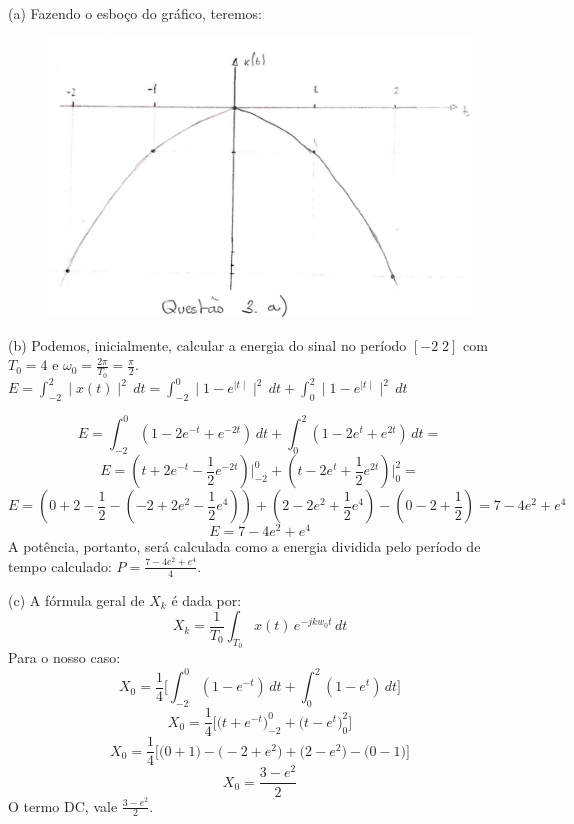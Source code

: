 \documentclass{article}
\begin{document}
\vspace{\baselineskip}

(a) Fazendo o esboço do gráfico, teremos:
\begin{figure}[h!]
    \includegraphics[scale=0.25]{img3a}
    \centering
\end{figure}

\vspace{\baselineskip}

(b) Podemos, inicialmente, calcular a energia do sinal no período $[-2\;2]$ com $T_{0} = 4$ e $\omega_{0} = \frac{2 \pi}{T_{0}} = \frac{\pi}{2}$.\\
$E = \int_{-2}^{2} \mid x(t) \mid ^{2}\,dt = \int_{-2}^{0} \mid 1 - e^{\mid t\mid} \mid^{2}\,dt + \int_{0}^{2} \mid 1 - e^{\mid t\mid} \mid^{2}\,dt$

\[E = \int_{-2}^{0} (1 - 2e^{-t} + e^{-2t})\,dt + \int_{0}^{2} (1 - 2e^{t} + e^{2t})\,dt =\]
\[E = (t + 2e^{-t} - \frac{1}{2}e^{-2t}) \bigg|_{-2}^{0} + (t - 2e^{t} + \frac{1}{2}e^{2t}) \bigg|_{0}^{2} = \]
\[E = (0 +2 - \frac{1}{2} - (-2 + 2e^{2} - \frac{1}{2}e^{4})) + (2 - 2e^{2} + \frac{1}{2}e^{4}) - (0 -2 + \frac{1}{2}) = 7 - 4e^{2} + e^{4}\]
\[E = 7 - 4e^{2} + e^{4}\]
A potência, portanto, será calculada como a energia dividida pelo período de tempo calculado: $P = \frac{7 - 4e^{2} + e^{4}}{4}$.

\vspace{\baselineskip}

(c) A fórmula geral de $X_{k}$ é dada por:
\[X_{k} = \frac{1}{T_{0}} \int_{T_{0}} x(t)\,e^{-jkw_{0}t}\,dt\]
Para o nosso caso:
\[X_{0} = \frac{1}{4} \biggl[\int_{-2}^{0} (1 - e^{-t})\,dt + \int_{0}^{2} (1 - e^{t})\,dt\biggr]\]
\[X_{0} = \frac{1}{4} \biggl[\bigl(t + e^{-t}\bigr)_{-2}^{0} + \bigl(t - e^{t}\bigr)_{0}^{2}\biggr]\]
\[X_{0} = \frac{1}{4} \biggl[\bigl(0 + 1\bigr) - \bigl(-2 + e^{2}\bigr) + \bigl(2 - e^{2}\bigr) - \bigl(0 - 1\bigr)\biggr]\]
\[X_{0} = \frac{3 - e^{2}}{2}\]
O termo DC, vale $\frac{3 - e^{2}}{2}$.
\end{document}
